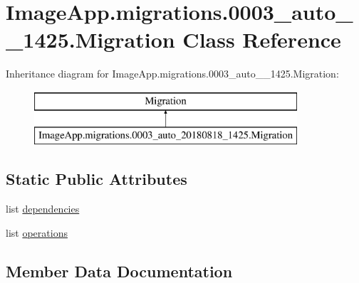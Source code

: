 \hypertarget{class_image_app_1_1migrations_1_10003__auto__20180818__1425_1_1_migration}{}\section{Image\+App.\+migrations.0003\+\_\+auto\+\_\+\_\+1425.Migration Class Reference}
\label{class_image_app_1_1migrations_1_10003__auto__20180818__1425_1_1_migration}
Inheritance diagram for Image\+App.\+migrations.0003\+\_\+auto\+\_\+\_\+1425.Migration\+:\begin{figure}[H]
\begin{center}
\leavevmode
\includegraphics[height=2.000000cm]{class_image_app_1_1migrations_1_10003__auto__20180818__1425_1_1_migration}
\end{center}
\end{figure}
\subsection*{Static Public Attributes}
\begin{DoxyCompactItemize}
\item 
list \mbox{\hyperlink{class_image_app_1_1migrations_1_10003__auto__20180818__1425_1_1_migration_a33c13fdbeb1e5e28d03d1a1fc391dad3}{dependencies}}
\item 
list \mbox{\hyperlink{class_image_app_1_1migrations_1_10003__auto__20180818__1425_1_1_migration_aae609b480f1a2542bd52396572fc1574}{operations}}
\end{DoxyCompactItemize}


\subsection{Member Data Documentation}
\mbox{\label{class_image_app_1_1migrations_1_10003__auto__20180818__1425_1_1_migration_a33c13fdbeb1e5e28d03d1a1fc391dad3}} 
